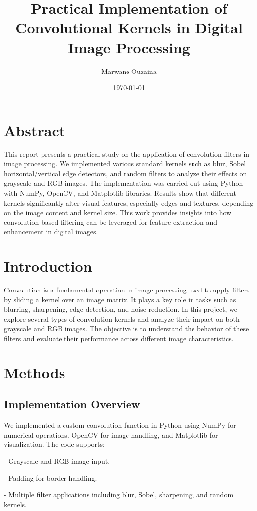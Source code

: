 \documentclass[12pt,a4paper]{article}
\title{Practical Implementation of Convolutional Kernels in Digital Image Processing}
\author{Marwane Ouzaina}
\date{\today}
\begin{document}
	
	\maketitle
	
	\section*{Abstract}
	This report presents a practical study on the application of convolution filters in image processing. We implemented various standard kernels such as blur, Sobel horizontal/vertical edge detectors, and random filters to analyze their effects on grayscale and RGB images. The implementation was carried out using Python with NumPy, OpenCV, and Matplotlib libraries. Results show that different kernels significantly alter visual features, especially edges and textures, depending on the image content and kernel size. This work provides insights into how convolution-based filtering can be leveraged for feature extraction and enhancement in digital images.
	
	\section{Introduction}
	Convolution is a fundamental operation in image processing used to apply filters by sliding a kernel over an image matrix. It plays a key role in tasks such as blurring, sharpening, edge detection, and noise reduction. In this project, we explore several types of convolution kernels and analyze their impact on both grayscale and RGB images. The objective is to understand the behavior of these filters and evaluate their performance across different image characteristics.
	
	\section{Methods}
	\subsection{Implementation Overview}
	We implemented a custom convolution function in Python using NumPy for numerical operations, OpenCV for image handling, and Matplotlib for visualization. The code supports:
	
	
	- Grayscale and RGB image input.
	
	- Padding for border handling.
	
	- Multiple filter applications including blur, Sobel, sharpening, and random kernels.
	
\end{document}
